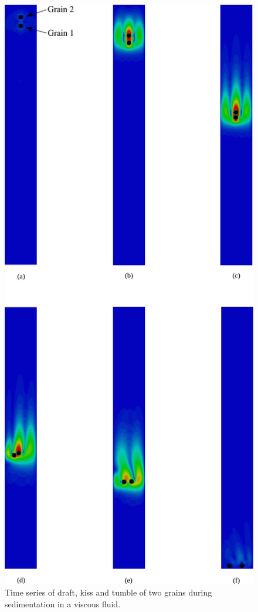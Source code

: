 \begin{figure}[tbhp]
\centering
\includegraphics[height=0.9\textheight]{kissing}
\caption{Time series of draft, kiss and tumble of two grains during 
sedimentation in a viscous fluid.}
\label{fig:kissing}
\end{figure}

